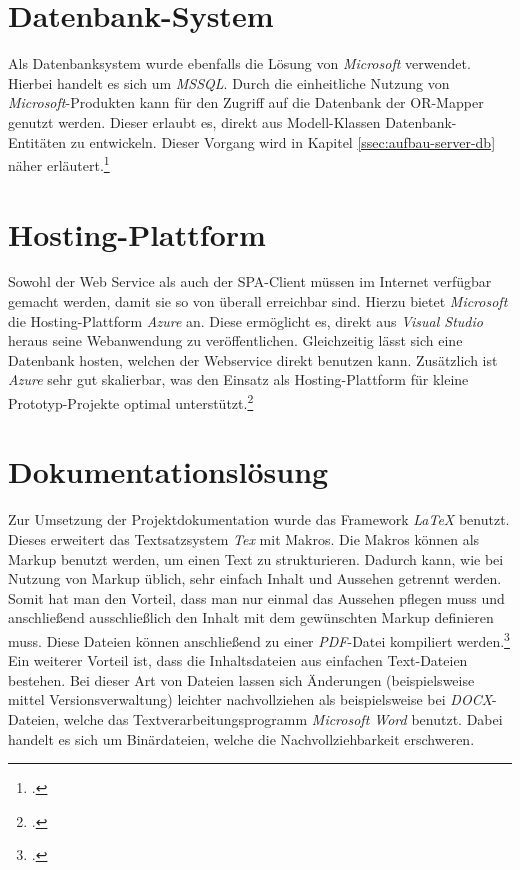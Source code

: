 \section{Datenbank-System}
\label{sec:DB-System}
Als Datenbanksystem wurde ebenfalls die Lösung von \textit{Microsoft} verwendet. Hierbei handelt es sich um \textit{\ac{MSSQL}}. Durch die einheitliche Nutzung von \textit{Microsoft}-Produkten kann für den Zugriff auf die Datenbank der \ac{OR-Mapper} genutzt werden. Dieser erlaubt es, direkt aus Modell-Klassen Datenbank-Entitäten zu entwickeln. Dieser Vorgang wird in Kapitel \ref{ssec:aufbau-server-db} näher erläutert.\footcite{online:SQLServer}
\section{Hosting-Plattform}
\label{sec:Hosting-Plattform}
Sowohl der Web Service als auch der \ac{SPA}-Client müssen im Internet verfügbar gemacht werden, damit sie so von überall erreichbar sind. Hierzu bietet \textit{Microsoft} die Hosting-Plattform \textit{Azure} an. Diese ermöglicht es, direkt aus \textit{\ac{Visual Studio}} heraus seine Webanwendung zu veröffentlichen. Gleichzeitig lässt sich eine Datenbank hosten, welchen der Webservice direkt benutzen kann. Zusätzlich ist \textit{Azure} sehr gut skalierbar, was den Einsatz als Hosting-Plattform für kleine Prototyp-Projekte optimal unterstützt.\footcite{online:Azure}
\section{Dokumentationslösung}
\label{sec:dokumentationslösung}
Zur Umsetzung der Projektdokumentation wurde das Framework \textit{LaTeX} benutzt. Dieses erweitert das Textsatzsystem \textit{Tex} mit Makros. Die Makros können als Markup benutzt werden, um einen Text zu strukturieren. Dadurch kann, wie bei Nutzung von Markup üblich, sehr einfach Inhalt und Aussehen getrennt werden. Somit hat man den Vorteil, dass man nur einmal das Aussehen pflegen muss und anschließend ausschließlich den Inhalt mit dem gewünschten Markup definieren muss. Diese Dateien können anschließend zu einer \textit{PDF}-Datei kompiliert werden.\footcite{online:definition-latex}\\ Ein weiterer Vorteil ist, dass die Inhaltsdateien aus einfachen Text-Dateien bestehen. Bei dieser Art von Dateien lassen sich Änderungen (beispielsweise mittel Versionsverwaltung) leichter nachvollziehen als beispielsweise bei \textit{DOCX}-Dateien, welche das Textverarbeitungsprogramm \textit{Microsoft Word} benutzt. Dabei handelt es sich um Binärdateien, welche die Nachvollziehbarkeit erschweren.
